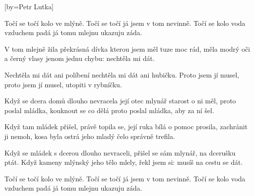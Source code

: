 [by={Petr Lutka}]

\beginverse{}
Točí se točí kolo ve mlýně.
Točí se točí já jsem v tom nevinně.
Točí se kolo voda vzduchem padá
já tomu mlejnu ukazuju záda.
\endverse{}

\beginverse{}
V tom mlejně žila překrásná dívka
kterou jsem měl tuze moc rád,
měla modrý oči a černý vlasy
jenom jednu chybu: nechtěla mi dát.
\endverse{}

\beginverse{}
Nechtěla mi dát ani políbení
nechtěla mi dát ani hubičku.
Proto jsem jí musel, proto jsem jí musel,
utopiti v rybníčku.
\endverse{}

\beginverse{}
Když se dcera domů dlouho nevracela
její otec mlynář starost o ni měl,
proto poslal mládka, kouknout se co dělá
proto poslal mládka, aby za ní šel.
\endverse{}

\beginverse{}
Když tam mládek přišel, právě topila se,
její ruka bílá o pomoc prosila,
zachránit ji nemoh, kosa byla ostrá
jeho mladý čelo správně trefila.
\endverse{}

\beginverse{}
Když se mládek s dcerou dlouho nevraceli,
přišel se sám mlynář, na dcerušku ptát.
Když kameny mlýnský jeho tělo mlely,
řekl jsem si: musíš na cestu se dát.
\endverse{}

\beginverse{}
Točí se točí kolo ve mlýně.
Točí se točí já jsem v tom nevinně.
Točí se kolo voda vzduchem padá
já tomu mlejnu ukazuju záda.
\endverse{}

\endsong{}

